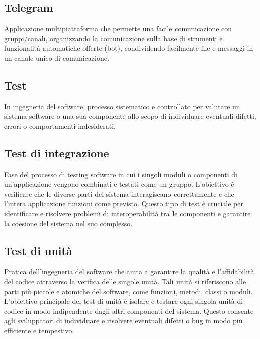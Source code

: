 \section{}

\hypertarget{sec:telegram}{}
\subsection*{Telegram}
Applicazione multipiattaforma che permette una facile comunicazione con gruppi/canali, organizzando la comunicazione sulla base di strumenti e 
funzionalità automatiche offerte (bot), condividendo facilmente file e messaggi in un canale unico di comunicazione.

\hypertarget{sec:test}{}
\subsection*{Test}
In ingegneria del software, processo sistematico e controllato per valutare un sistema software o una sua componente allo scopo di individuare eventuali 
difetti, errori o comportamenti indesiderati.

\hypertarget{sec:test_integrazione}{}
\subsection*{Test di integrazione}
Fase del processo di testing software in cui i singoli moduli o componenti di un’applicazione vengono combinati e testati come un
gruppo. L’obiettivo è verificare che le diverse parti del sistema interagiscano correttamente e che l’intera applicazione funzioni
come previsto. Questo tipo di test è cruciale per identificare e risolvere problemi di interoperabilità tra le componenti e garantire
la coesione del sistema nel suo complesso.

\hypertarget{sec:test_unità}{}
\subsection*{Test di unità}
Pratica dell’ingegneria del software che aiuta a garantire la qualità e l’affidabilità del codice attraverso la verifica delle
singole unità. Tali unità si riferiscono alle parti più piccole e atomiche del software, come funzioni, metodi, classi o moduli.
L’obiettivo principale del test di unità è isolare e testare ogni singola unità di codice in modo indipendente dagli altri componenti
del sistema. Questo consente agli sviluppatori di individuare e risolvere eventuali difetti o bug in modo più efficiente e tempestivo.

